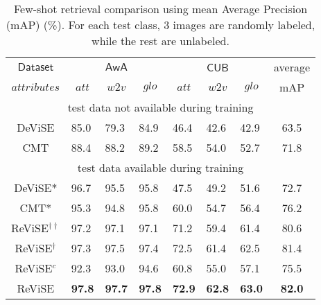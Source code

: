 {{}
\begin{table}[t!]
\centering
\caption{\footnotesize Few-shot retrieval comparison using mean Average Precision (mAP) (\%). For each test class, 3 images are randomly labeled, while the rest are unlabeled. }
\vspace{1mm}
\scalebox{0.72}
{
\begin{tabular}{|c||lll||lll||c|}
\hline
$\mathsf{Dataset}$ & \multicolumn{3}{c||}{$\mathsf{AwA}$}                                                      & \multicolumn{3}{c||}{$\mathsf{CUB}$}                                                     & average                          \\
                    $\textit{attributes}$    & \multicolumn{1}{c}{$\textit{att}$} & \multicolumn{1}{c}{$\textit{w2v}$} & \multicolumn{1}{c||}{$\textit{glo}$} & \multicolumn{1}{c}{$\textit{att}$} & \multicolumn{1}{c}{$\textit{w2v}$} & \multicolumn{1}{c||}{$\textit{glo}$} & mAP \\  \hline \hline
\multicolumn{8}{|c|}{test data not available during training}                                                                                                                                                                                        \\ \hline \hline
DeViSE \cite{frome2013devise}     &   85.0  &   79.3  &  84.9  &   46.4    &    42.6   & 42.9       &  63.5  \\
CMT \cite{socher2013zero}    &  88.4  &    88.2    &  89.2   &    58.5     &    54.0   &    52.7   &  71.8   \\ \hline \hline
\multicolumn{8}{|c|}{test data available during training}                                                                                                                                                                                        \\ \hline \hline
DeViSE* \cite{frome2013devise}      &      96.7   &     95.5      &   95.8     &47.5     &   49.2   &   51.6    & 72.7   \\
CMT* \cite{socher2013zero}    &   95.3   &    94.8       &  95.8  &   60.0  &  54.7    &    56.4  &  76.2   \\
ReViSE$^{\dagger\dagger}$ &  97.2   &   97.1     &    97.1   &   71.2   &   59.4   &   61.4  &    80.6     \\
ReViSE$^{\dagger}$ &   97.3    &   97.5    &   97.4      &   72.5    &   61.4   &  62.5    &   81.4  \\
ReViSE$^{c}$ &  92.3  & 93.0  &  94.6    &  60.8 &  55.0 &  57.1   &  75.5 \\
ReViSE   &     {\bf 97.8}   &  {\bf 97.7}    &  {\bf 97.8}  &    {\bf 72.9}  &    {\bf 62.8}  &   {\bf 63.0}    &    {\bf 82.0} \\ \hline
\end{tabular}
}
\vspace{-4mm}
\label{tbl:few_retriev}
\end{table}



}

